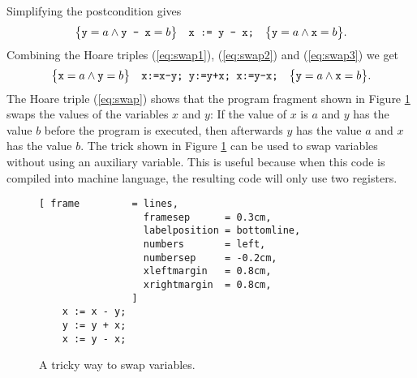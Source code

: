 Simplifying the postcondition gives
\begin{equation}
  \label{eq:swap3}
  \bigl\{\texttt{y} = a \wedge \texttt{y - x} = b\bigr\}\quad\texttt{x := y - x;}\quad\bigl\{ \texttt{y} = a \wedge \texttt{x} = b\bigr\}.   
\end{equation}
Combining the Hoare triples (\ref{eq:swap1}), (\ref{eq:swap2}) and (\ref{eq:swap3})
we get
\begin{equation}
  \label{eq:swap}
  \bigl\{\texttt{x} = a \wedge \texttt{y} = b\bigr\}\quad\texttt{x:=x-y; y:=y+x; x:=y-x;}\quad\bigl\{ 
         \texttt{y} = a \wedge \texttt{x} = b\bigr\}.   
\end{equation}
The Hoare triple (\ref{eq:swap}) shows that the program fragment shown in Figure
\ref{fig:swap} swaps the values of the variables $x$ and $y$: If the value of 
$x$ is $a$ and $y$ has the value $b$ before the program is executed, then afterwards
$y$ has the value $a$ and $x$ has the value $b$.  The trick shown in Figure
\ref{fig:swap} 
can be used to swap variables without using an auxiliary variable.  This is useful because when this
code is compiled into machine language, the resulting code will only use two registers.


\begin{figure}[!ht]
\centering
\begin{Verbatim}[ frame         = lines, 
                  framesep      = 0.3cm, 
                  labelposition = bottomline,
                  numbers       = left,
                  numbersep     = -0.2cm,
                  xleftmargin   = 0.8cm,
                  xrightmargin  = 0.8cm,
                ]
    x := x - y;
    y := y + x;
    x := y - x;
\end{Verbatim}
\vspace*{-0.3cm}
\caption{A tricky way to swap variables.}
\label{fig:swap}
\end{figure}



